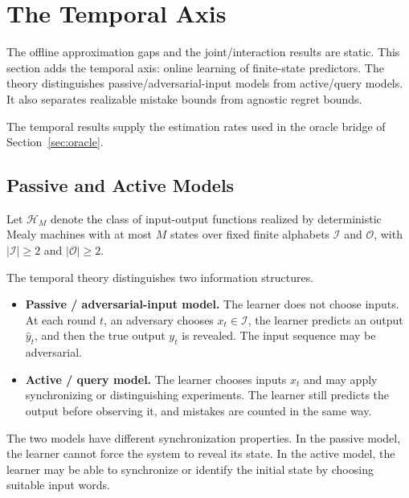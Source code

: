 \documentclass[12pt]{article}
\theoremstyle{definition}
\begin{document}
\section{The Temporal Axis}
\label{sec:temporal}

The offline approximation gaps and the joint/interaction results are static.
This section adds the temporal axis: online learning of finite-state
predictors.  The theory distinguishes passive/adversarial-input models from
active/query models.  It also separates realizable mistake bounds from
agnostic regret bounds.

The temporal results supply the estimation rates used in the oracle bridge of
Section~\ref{sec:oracle}.

\subsection{Passive and Active Models}
\label{subsec:temporal-models}

Let $\mathcal H_M$ denote the class of input-output functions realized by
deterministic Mealy machines with at most $M$ states over fixed finite
alphabets $\mathcal I$ and $\mathcal O$, with $|\mathcal I|\ge2$ and
$|\mathcal O|\ge2$.

The temporal theory distinguishes two information structures.

\begin{itemize}[leftmargin=1.8em]
\item \textbf{Passive / adversarial-input model.}
The learner does not choose inputs.  At each round $t$, an adversary chooses
$x_t\in\mathcal I$, the learner predicts an output $\widehat y_t$, and then
the true output $y_t$ is revealed.  The input sequence may be adversarial.

\item \textbf{Active / query model.}
The learner chooses inputs $x_t$ and may apply synchronizing or
distinguishing experiments.  The learner still predicts the output before
observing it, and mistakes are counted in the same way.
\end{itemize}

The two models have different synchronization properties.  In the passive
model, the learner cannot force the system to reveal its state.  In the active
model, the learner may be able to synchronize or identify the initial state by
choosing suitable input words.
\end{document}
